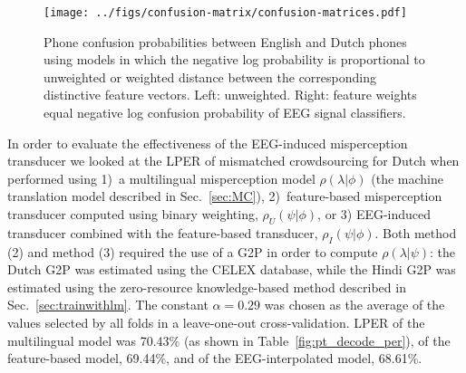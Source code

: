\begin{figure}
  \centerline{
    \texttt{[image: ../figs/confusion-matrix/confusion-matrices.pdf]}
  }
    \vspace*{-0.3cm}
  \caption{Phone confusion probabilities between English and Dutch
    phones using models in which the negative log
    probability is proportional to unweighted or weighted
    distance between the corresponding
    distinctive feature vectors.  Left: unweighted.
    Right: feature weights equal negative log confusion
    probability of EEG signal classifiers.}
  \label{fig:eeg_confusions}
\end{figure}

In order to evaluate the effectiveness of the EEG-induced
misperception transducer we looked at the LPER of mismatched
crowdsourcing for Dutch when performed using 1)~a multilingual
misperception model $\rho(\lambda|\phi)$ (the machine translation
model described in Sec.~\ref{sec:MC}), 2)~feature-based misperception
transducer computed using binary weighting, $\rho_U(\psi|\phi)$, or 3)
EEG-induced transducer combined with the feature-based transducer,
$\rho_I(\psi|\phi)$.  Both method (2) and method (3)
required the use of a G2P in order to compute $\rho(\lambda|\psi)$:
the Dutch G2P was estimated using the CELEX database, while the Hindi
G2P was estimated using the zero-resource knowledge-based method
described in Sec.~\ref{sec:trainwithlm}.  The constant $\alpha=0.29$ was
chosen as the average of the values selected by all folds in a
leave-one-out cross-validation.  LPER of the multilingual model was
70.43\% (as shown in Table~\ref{fig:pt_decode_per}), of
the feature-based model, 69.44\%, and of the EEG-interpolated model,
68.61\%.



